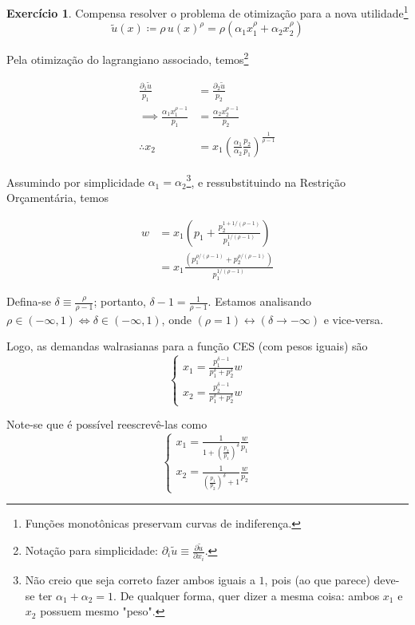 \documentclass[12pt]{article}
\numberwithin{equation}{section}
\theoremstyle{plain}
\theoremstyle{definition}
\newtheorem{exercise}{Exercício}
\theoremstyle{remark}
\begin{document}
\begin{exercise}
    Compensa resolver o problema de otimização para a nova
utilidade\footnote{Funções monotônicas preservam curvas de indiferença.} \[
\tilde{u}(x) \coloneqq \rho \, u(x)^\rho = \rho (\alpha_{1} x_{1}^\rho + \alpha_{2} x_{2}^\rho)
\]

Pela otimização do lagrangiano associado, temos\footnote{Notação para simplicidade: $\partial_{i} \tilde{u} \equiv \frac{ \partial \tilde{u} }{ \partial x_{i} }$.}

\begin{align*}
\frac{\partial_{1}\tilde{u}}{p_{1}} &= \frac{\partial_{2}\tilde{u}}{p_{2}} \\
\implies \frac{\alpha_{1} x_{1}^{\rho-1}}{p_{1}} &= \frac{\alpha_{2} x_{2}^{\rho -1}}{p_{2}} \\
\therefore x_{2} &= x_{1} \left( \frac{\alpha_{1}}{\alpha_{2}} \frac{p_{2}}{p_{1}} \right)^{\frac{1}{\rho-1}}
\end{align*}

Assumindo por simplicidade \(\alpha_{1} = \alpha_{2}\)\footnote{Não creio que seja correto fazer ambos iguais a $1$, pois (ao que parece) deve-se ter $\alpha_{1}+\alpha_{2}=1$. De qualquer forma, quer dizer a mesma coisa: ambos $x_{1}$ e $x_{2}$ possuem mesmo "peso".}, e ressubstituindo
na Restrição Orçamentária, temos

\begin{align*}
w &= x_{1}\left( p_{1} + \frac{p_{2}^{1 + 1/(\rho-1)}}{p_{1}^{1/(\rho-1)}} \right) \\
&= x_{1} \frac{(p_{1}^{\rho/(\rho-1)} + p_{2}^{\rho/(\rho-1)})}{p_{1}^{1/(\rho-1)}}
\end{align*}


Defina-se \(\delta \equiv \frac{\rho}{\rho-1}\); portanto,
\(\delta-1 = \frac{1}{\rho-1}\). Estamos analisando
\(\rho \in (-\infty, 1) \iff \delta \in (-\infty, 1)\), onde
\((\rho=1) \leftrightarrow (\delta \to -\infty)\) e vice-versa.

Logo, as demandas walrasianas para a função CES (com pesos iguais) são
\[
\begin{cases}
x_{1} = \frac{p_{1}^{\delta-1}}{p_{1}^\delta + p_{2}^\delta} w \\
x_{2} = \frac{p_{2}^{\delta-1}}{p_{1}^\delta + p_{2}^\delta} w
\end{cases}
\]

Note-se que é possível reescrevê-las como \[
\begin{cases}
x_{1} = \frac{1}{1 + \left( \frac{p_{2}}{p_{1}} \right)^\delta} \frac{w}{p_{1}} \\
x_{2} = \frac{1}{\left( \frac{p_{1}}{p_{2}} \right)^\delta + 1} \frac{w}{p_{2}}
\end{cases}
\]

\end{exercise}
\end{document}
